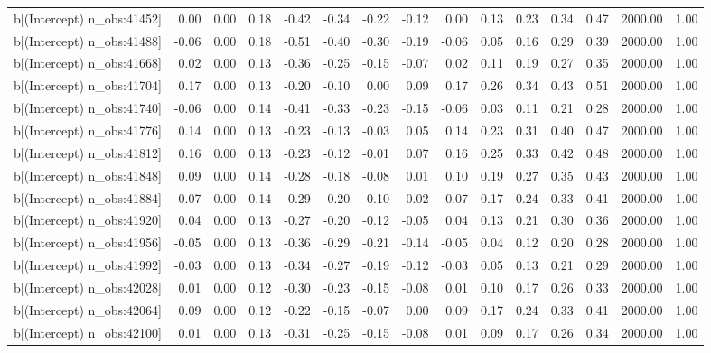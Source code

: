 \begin{table}[ht]
\begin{tabular}{rrrrrrrrrrrrrrr}
  b[(Intercept) n\_obs:41452] & 0.00 & 0.00 & 0.18 & -0.42 & -0.34 & -0.22 & -0.12 & 0.00 & 0.13 & 0.23 & 0.34 & 0.47 & 2000.00 & 1.00 \\ 
  b[(Intercept) n\_obs:41488] & -0.06 & 0.00 & 0.18 & -0.51 & -0.40 & -0.30 & -0.19 & -0.06 & 0.05 & 0.16 & 0.29 & 0.39 & 2000.00 & 1.00 \\ 
  b[(Intercept) n\_obs:41668] & 0.02 & 0.00 & 0.13 & -0.36 & -0.25 & -0.15 & -0.07 & 0.02 & 0.11 & 0.19 & 0.27 & 0.35 & 2000.00 & 1.00 \\ 
  b[(Intercept) n\_obs:41704] & 0.17 & 0.00 & 0.13 & -0.20 & -0.10 & 0.00 & 0.09 & 0.17 & 0.26 & 0.34 & 0.43 & 0.51 & 2000.00 & 1.00 \\ 
  b[(Intercept) n\_obs:41740] & -0.06 & 0.00 & 0.14 & -0.41 & -0.33 & -0.23 & -0.15 & -0.06 & 0.03 & 0.11 & 0.21 & 0.28 & 2000.00 & 1.00 \\ 
  b[(Intercept) n\_obs:41776] & 0.14 & 0.00 & 0.13 & -0.23 & -0.13 & -0.03 & 0.05 & 0.14 & 0.23 & 0.31 & 0.40 & 0.47 & 2000.00 & 1.00 \\ 
  b[(Intercept) n\_obs:41812] & 0.16 & 0.00 & 0.13 & -0.23 & -0.12 & -0.01 & 0.07 & 0.16 & 0.25 & 0.33 & 0.42 & 0.48 & 2000.00 & 1.00 \\ 
  b[(Intercept) n\_obs:41848] & 0.09 & 0.00 & 0.14 & -0.28 & -0.18 & -0.08 & 0.01 & 0.10 & 0.19 & 0.27 & 0.35 & 0.43 & 2000.00 & 1.00 \\ 
  b[(Intercept) n\_obs:41884] & 0.07 & 0.00 & 0.14 & -0.29 & -0.20 & -0.10 & -0.02 & 0.07 & 0.17 & 0.24 & 0.33 & 0.41 & 2000.00 & 1.00 \\ 
  b[(Intercept) n\_obs:41920] & 0.04 & 0.00 & 0.13 & -0.27 & -0.20 & -0.12 & -0.05 & 0.04 & 0.13 & 0.21 & 0.30 & 0.36 & 2000.00 & 1.00 \\ 
  b[(Intercept) n\_obs:41956] & -0.05 & 0.00 & 0.13 & -0.36 & -0.29 & -0.21 & -0.14 & -0.05 & 0.04 & 0.12 & 0.20 & 0.28 & 2000.00 & 1.00 \\ 
  b[(Intercept) n\_obs:41992] & -0.03 & 0.00 & 0.13 & -0.34 & -0.27 & -0.19 & -0.12 & -0.03 & 0.05 & 0.13 & 0.21 & 0.29 & 2000.00 & 1.00 \\ 
  b[(Intercept) n\_obs:42028] & 0.01 & 0.00 & 0.12 & -0.30 & -0.23 & -0.15 & -0.08 & 0.01 & 0.10 & 0.17 & 0.26 & 0.33 & 2000.00 & 1.00 \\ 
  b[(Intercept) n\_obs:42064] & 0.09 & 0.00 & 0.12 & -0.22 & -0.15 & -0.07 & 0.00 & 0.09 & 0.17 & 0.24 & 0.33 & 0.41 & 2000.00 & 1.00 \\ 
  b[(Intercept) n\_obs:42100] & 0.01 & 0.00 & 0.13 & -0.31 & -0.25 & -0.15 & -0.08 & 0.01 & 0.09 & 0.17 & 0.26 & 0.34 & 2000.00 & 1.00 \\ 

\end{tabular}
\end{table}
